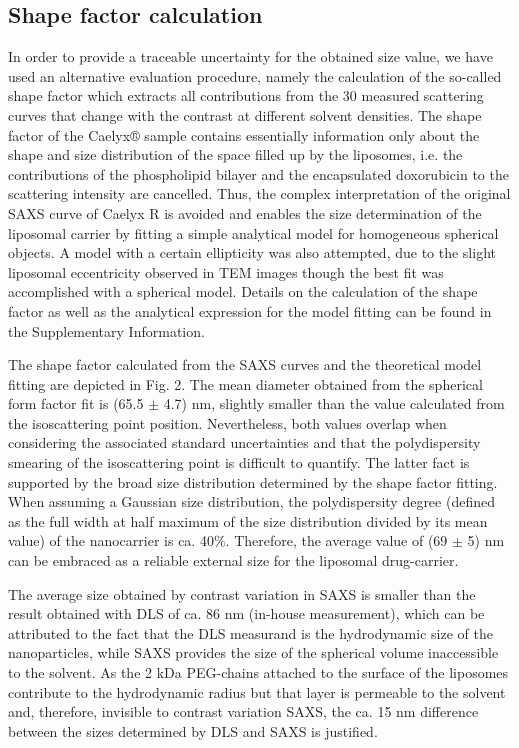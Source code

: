 \subsection{Shape factor calculation}
In order to provide a traceable uncertainty for the obtained size value, we have used an alternative evaluation procedure, namely the calculation of the so-called shape factor which extracts all contributions from the 30 measured scattering curves that change with the contrast at different solvent densities. The shape factor of the Caelyx® sample contains essentially information only about the shape and size distribution of the space filled up by the liposomes, i.e. the contributions of the phospholipid bilayer and the encapsulated doxorubicin to the scattering intensity are cancelled.  Thus, the complex interpretation of the original SAXS curve of Caelyx R is avoided and enables the size determination of the liposomal carrier by fitting a simple analytical model for homogeneous spherical objects. A model with a certain ellipticity was also attempted, due to the slight liposomal eccentricity observed in TEM images though the best fit was accomplished with a spherical model. Details on the calculation of the shape factor as well as the analytical expression for the model fitting can be found in the Supplementary Information. 

The shape factor calculated from the SAXS curves and the theoretical model fitting are depicted in Fig. 2. The mean diameter obtained from the spherical form factor fit is (65.5 $\pm$ 4.7) nm, slightly smaller than the value calculated from the isoscattering point position. Nevertheless, both values overlap when considering the associated standard uncertainties and that the polydispersity smearing of the isoscattering point is difficult to quantify. The latter fact is supported by the broad size distribution determined by the shape factor fitting. When assuming a Gaussian size distribution, the polydispersity degree (defined as the full width at half maximum of the size distribution divided by its mean value) of the nanocarrier is ca. 40$\%$. Therefore, the average value of (69 $\pm$ 5) nm can be embraced as a reliable external size for the liposomal drug-carrier.

The average size obtained by contrast variation in SAXS is smaller than the result obtained with DLS of ca. 86 nm (in-house measurement), which can be attributed to the fact that the DLS measurand is the hydrodynamic size of the nanoparticles, while SAXS provides the size of the spherical volume inaccessible to the solvent. As the 2 kDa PEG-chains attached to the surface of the liposomes contribute to the hydrodynamic radius but that layer is permeable to the solvent and, therefore, invisible to contrast variation SAXS, the ca. 15 nm difference between the sizes determined by DLS and SAXS is justified. 


